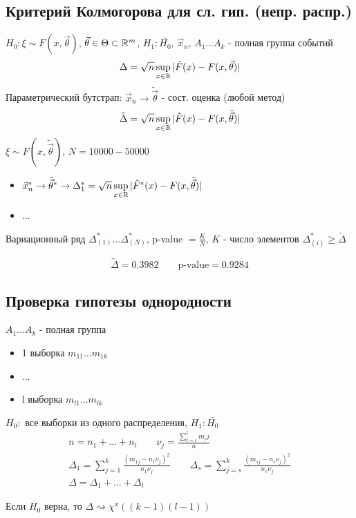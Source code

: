 \documentclass{article}
\begin{document}
\subsection{Критерий Колмогорова для сл. гип. (непр. распр.)}
$H_0: \xi \sim F(x, \vec{\theta})$, $\vec{\theta} \in \Theta \subset \mathbb{R}^{m}$,
$H_1:\bar{H_0}$, $\vec{x}_n$, $A_1\dots A_k$ - полная группа событий
\begin{gather*}
  \Delta = \sqrt{n}\sup \limits_{x\in \mathbb{R}}|\tilde{F}(x)-F(x, \vec{\theta})|
\end{gather*}
Параметрический бутстрап: $\vec{x}_n \rightarrow \tilde{\vec{\theta}}$ - сост. оценка (любой метод)
\begin{gather*}
  \tilde{\Delta} = \sqrt{n}\sup \limits_{x\in \mathbb{R}}|\tilde{F}(x)-F(x, \tilde{\vec{\theta}})|
\end{gather*}
$\xi \sim F(x, \tilde{\vec{\theta}})$, $N=10 0 0 0 - 50 0 0 0$
\begin{itemize}
  \item $\vec{x}_n^{*} \rightarrow \tilde{\vec{\theta}}^{*} \rightarrow \Delta_1^{*}=\sqrt{n}\sup \limits_{x\in\mathbb{R}}|\tilde{F}^{*}(x)-F(x, \tilde{\vec{\theta}})|$
  \item ...
\end{itemize}
Вариационный ряд $\Delta_{(1)}^{*}\dots \Delta_{(N)}^{*}$, p-value $=\frac{K}{N}$,
$K$ - число элементов $\Delta_{(i)}^{*} \ge \tilde{\Delta}$
\begin{eg}[Эрланг]
  \[
    \tilde{\Delta}=0.3982 \qquad \text{p-value}=0.9284
  \]
\end{eg}

\subsection{Проверка гипотезы однородности}
$A_1\dots A_{k}$ - полная группа
\begin{itemize}
  \item 1 выборка $m_{11}\dots m_{1k}$
  \item ...
  \item l выборка $m_{l1}\dots m_{lk}$
\end{itemize}
$H_0:$ все выборки из одного распределения, $H_1:\bar{H_0}$
\begin{gather*}
  n = n_1 + \dots  + n_l \qquad \nu_{j}=\frac{\sum_{i=1}^{l}m_ij}{n} \\ 
  \Delta_1=\sum_{j=1}^{k}\frac{(m_{1j}-n_1\nu_j)^{2}}{n_1\nu_j} \qquad
  \Delta_s=\sum_{j=s}^{k}\frac{(m_{sj}-n_s\nu_j)^{2}}{n_s\nu_j} \\ 
  \Delta = \Delta_1+ \dots + \Delta_l
\end{gather*}
\begin{theorem}
  Если $H_0$ верна, то $\Delta \rightsquigarrow \chi^{x}((k-1)(l-1))$
\end{theorem}
\end{document}

